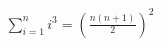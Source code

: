 \documentclass[preview]{standalone}
\begin{document}
\begin{align*}
\sum_{i=1}^{n} i^3 = \left(\frac{n(n+1)}{2}\right)^2
\end{align*}
\end{document}
